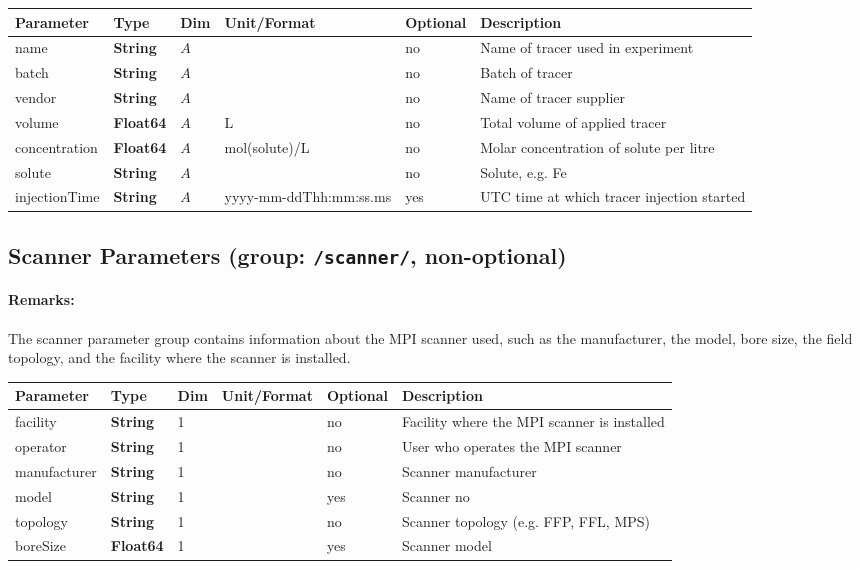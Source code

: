 \documentclass[landscape,a4paper]{article} %
\newcommand{\inl}[1]{\lstinline[columns=fixed]{#1}}
\newcommand{\inltab}[1]{{\ttfamily\bfseries\color{blue}#1}}
\newcommand{\inlvar}[1]{{\ttfamily#1}}
\begin{document}
\noindent \begin{tabularx}{\columnwidth}{lllllX} 
\textbf{Parameter} & \textbf{Type} & \textbf{Dim} & \textbf{Unit/Format} & \textbf{Optional} & \textbf{Description} \\ \hline 
\inlvar{name} & \inltab{String} & $A$ & & no & Name of tracer used in experiment \\ \hline
\inlvar{batch} & \inltab{String} & $A$ & & no & Batch of tracer \\ \hline
\inlvar{vendor} & \inltab{String} & $A$ & & no & Name of tracer supplier \\ \hline
\inlvar{volume} & \inltab{Float64} & $A$ & L & no & Total volume of applied tracer \\ \hline
\inlvar{concentration} & \inltab{Float64} & $A$ & mol(solute)/L & no & Molar concentration of solute per litre \\ \hline
\inlvar{solute} & \inltab{String} & $A$ & & no & Solute, e.g. Fe \\ \hline
\inlvar{injectionTime} & \inltab{String} & $A$ & yyyy-mm-ddThh:mm:ss.ms & yes & UTC time at which tracer injection started \\ \hline
\end{tabularx}


\subsection{Scanner Parameters (group: \inl{/scanner/}, non-optional)}

\begin{multicols}{2}
\paragraph{Remarks:} The scanner parameter group contains information about the MPI scanner used, such as the manufacturer, the model, bore size, the field topology, and the facility where the scanner is installed.
\end{multicols}

\noindent \begin{tabularx}{\columnwidth}{lllllX}
\noindent \textbf{Parameter} & \textbf{Type} & \textbf{Dim} & \textbf{Unit/Format} & \textbf{Optional} & \textbf{Description} \\ \hline 
\inlvar{facility} & \inltab{String} & 1 & & no & Facility where the MPI scanner is installed \\ \hline 
\inlvar{operator} & \inltab{String} & 1 & & no & User who operates the MPI scanner \\ \hline 
\inlvar{manufacturer} & \inltab{String} & 1 & & no & Scanner manufacturer \\ \hline 
\inlvar{model} & \inltab{String} & 1 & & yes & Scanner no \\ \hline 
\inlvar{topology} & \inltab{String} & 1 & & no & Scanner topology (e.g. FFP, FFL, MPS)\\ \hline 
\inlvar{boreSize} & \inltab{Float64} & 1 & & yes & Scanner model \\ \hline 
\end{tabularx}
\end{document}
